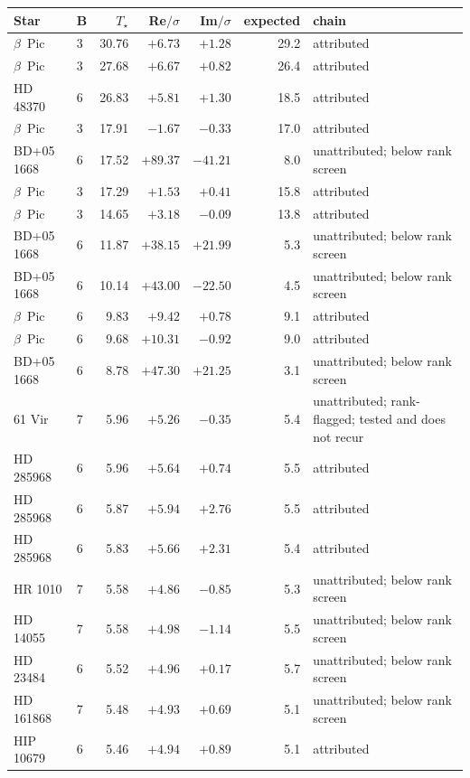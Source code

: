 \begin{tabular}{@{}llrrrrl@{}}
\toprule
Star & B & $T_\star$ & Re$/\sigma$ & Im$/\sigma$ & expected & chain \\
\midrule
$\beta$~Pic & 3 & 30.76 & $+6.73$ & $+1.28$ & 29.2 & attributed \\
$\beta$~Pic & 3 & 27.68 & $+6.67$ & $+0.82$ & 26.4 & attributed \\
HD 48370 & 6 & 26.83 & $+5.81$ & $+1.30$ & 18.5 & attributed \\
$\beta$~Pic & 3 & 17.91 & $-1.67$ & $-0.33$ & 17.0 & attributed \\
BD+05 1668 & 6 & 17.52 & $+89.37$ & $-41.21$ & 8.0 & unattributed; below rank screen \\
$\beta$~Pic & 3 & 17.29 & $+1.53$ & $+0.41$ & 15.8 & attributed \\
$\beta$~Pic & 3 & 14.65 & $+3.18$ & $-0.09$ & 13.8 & attributed \\
BD+05 1668 & 6 & 11.87 & $+38.15$ & $+21.99$ & 5.3 & unattributed; below rank screen \\
BD+05 1668 & 6 & 10.14 & $+43.00$ & $-22.50$ & 4.5 & unattributed; below rank screen \\
$\beta$~Pic & 6 & 9.83 & $+9.42$ & $+0.78$ & 9.1 & attributed \\
$\beta$~Pic & 6 & 9.68 & $+10.31$ & $-0.92$ & 9.0 & attributed \\
BD+05 1668 & 6 & 8.78 & $+47.30$ & $+21.25$ & 3.1 & unattributed; below rank screen \\
61 Vir & 7 & 5.96 & $+5.26$ & $-0.35$ & 5.4 & unattributed; rank-flagged; tested and does not recur \\
HD 285968 & 6 & 5.96 & $+5.64$ & $+0.74$ & 5.5 & attributed \\
HD 285968 & 6 & 5.87 & $+5.94$ & $+2.76$ & 5.5 & attributed \\
HD 285968 & 6 & 5.83 & $+5.66$ & $+2.31$ & 5.4 & attributed \\
HR 1010 & 7 & 5.58 & $+4.86$ & $-0.85$ & 5.3 & unattributed; below rank screen \\
HD 14055 & 7 & 5.58 & $+4.98$ & $-1.14$ & 5.5 & unattributed; below rank screen \\
HD 23484 & 6 & 5.52 & $+4.96$ & $+0.17$ & 5.7 & unattributed; below rank screen \\
HD 161868 & 7 & 5.48 & $+4.93$ & $+0.69$ & 5.1 & unattributed; below rank screen \\
HIP 10679 & 6 & 5.46 & $+4.94$ & $+0.89$ & 5.1 & attributed \\

\end{tabular}

